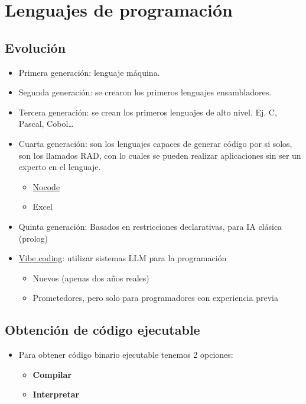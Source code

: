 \documentclass[a4paper]{article}
\begin{document}
\section{Lenguajes de programación}
\label{lenguajes-de-programación}
\subsection{Evolución}
\label{sec:org000000f}

\begin{itemize}
\item Primera generación: lenguaje máquina.
\item Segunda generación: se crearon los primeros lenguajes ensambladores.
\item Tercera generación: se crean los primeros lenguajes de alto nivel. Ej. C, Pascal, Cobol…
\item Cuarta generación: son los lenguajes capaces de generar código por si solos, son los llamados RAD, con lo cuales se pueden realizar aplicaciones sin ser un experto en el lenguaje.
\begin{itemize}
\item \href{https://www.nocode.tech/article/what-is-no-code}{Nocode}
\item Excel
\end{itemize}
\item Quinta generación: Basados en restricciones declarativas, para IA clásica (prolog)
\item \href{https://en.wikipedia.org/wiki/Vibe\_coding}{Vibe coding}: utilizar sistemas LLM para la programación
\begin{itemize}
\item Nuevos (apenas dos años reales)
\item Prometedores, pero solo para programadores con experiencia previa
\end{itemize}
\end{itemize}
\subsection{Obtención de código ejecutable}
\label{obtención-de-código-ejecutable}
\begin{itemize}
\item Para obtener código binario ejecutable tenemos 2 opciones:
\begin{itemize}
\item \textbf{Compilar}
\item \textbf{Interpretar}
\end{itemize}
\end{itemize}
\end{document}
